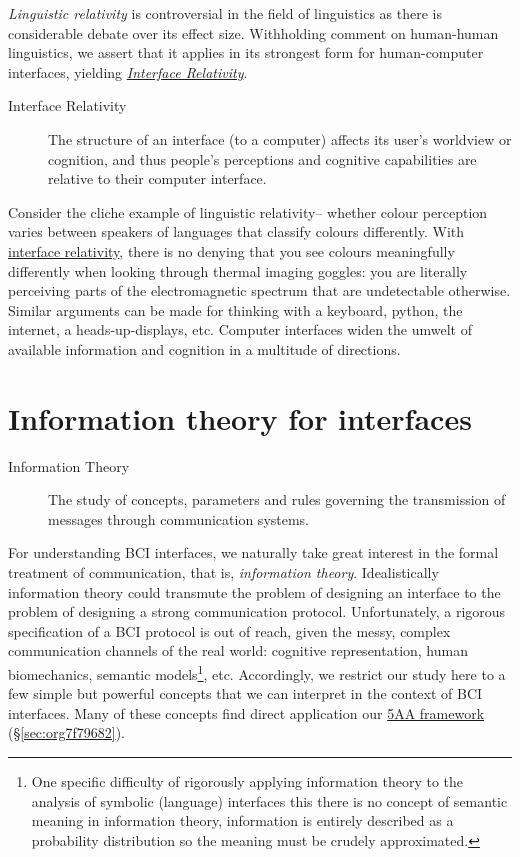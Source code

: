 \documentclass[logo,bsc,singlespacing,parskip]{infthesis}
\begin{document}
\emph{Linguistic relativity} is controversial in the field of linguistics as there is considerable debate over its effect size.
Withholding comment on human-human linguistics, we assert that it applies in its strongest form for human-computer interfaces, yielding \emph{\hyperref[orga30ac29]{Interface Relativity}}.

\begin{mdframed}
\begin{description}
\item[{\label{orga30ac29}Interface Relativity}] The structure of an interface (to a computer) affects its user's worldview or cognition, and thus people's perceptions and cognitive capabilities are relative to their computer interface.
\end{description}
\end{mdframed}

Consider the cliche example of linguistic relativity-- whether colour perception varies between speakers of languages that classify colours differently.
With \hyperref[orga30ac29]{interface relativity}, there is no denying that you see colours meaningfully differently when looking through thermal imaging goggles: you are literally perceiving parts of the electromagnetic spectrum that are undetectable otherwise.
Similar arguments can be made for thinking with a keyboard, python, the internet, a heads-up-displays, etc.
Computer interfaces widen the umwelt of available information and cognition in a multitude of directions.

\section{Information theory for interfaces}
\label{sec:org94f7b3f}
\begin{mdframed}
\begin{description}
\item[{Information Theory\label{information theory}}] The study of concepts, parameters and rules governing the transmission of messages through communication systems.
\end{description}
\end{mdframed}

For understanding BCI interfaces, we naturally take great interest in the formal treatment of communication, that is, \emph{information theory}.
Idealistically information theory could transmute the problem of designing an interface to the problem of designing a strong communication protocol.
Unfortunately, a rigorous specification of a BCI protocol is out of reach, given the messy, complex communication channels of the real world: cognitive representation, human biomechanics, semantic models\footnote{One specific difficulty of rigorously applying information theory to the analysis of symbolic (language) interfaces this there is no concept of semantic meaning in information theory, information is entirely described as a probability distribution so the meaning must be crudely approximated.}, etc.
Accordingly, we restrict our study here to a few simple but powerful concepts that we can interpret in the context of BCI interfaces.
Many of these concepts find direct application our \hyperref[sec:org7f79682]{5AA framework} (\S \ref{sec:org7f79682}).
\end{document}
